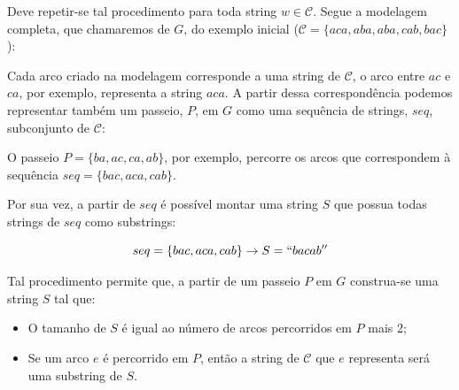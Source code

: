 \documentclass[12pt, a4paper]{article}
\begin{document}
        \sloppy Deve repetir-se tal procedimento para toda string $w \in \mathcal{C}$. Segue a modelagem completa, que chamaremos de $G$, do exemplo inicial ($\mathcal{C} = \{aca, aba, aba, cab, bac\}$):
       

        \begin{figure}[H]
            \centering
        \end{figure}


        Cada arco criado na modelagem corresponde a uma string de $\mathcal{C}$, o arco entre $ac$ e $ca$, por exemplo, representa a string $aca$.
        A partir dessa correspondência podemos representar também um passeio, $P$, em $G$ como uma sequência de strings, $seq$, subconjunto de $\mathcal{C}$:

        O passeio $P = \{ba, ac, ca, ab\}$, por exemplo, percorre os arcos que correspondem à sequência $seq = \{bac, aca, cab\}$.

        Por sua vez, a partir de $seq$ é possível montar uma string $S$ que possua todas strings de $seq$ como substrings:

        \[seq = \{bac, aca, cab\} \rightarrow S = ``bacab'' \]

        Tal procedimento permite que, a partir de um passeio $P$ em $G$ construa-se uma string $S$ tal que:
        
        \begin{itemize}
            \item O tamanho de $S$ é igual ao número de arcos percorridos em $P$ mais 2;
            \item Se um arco $e$ é percorrido em $P$, então a string de $\mathcal{C}$ que $e$ representa será uma substring de $S$.
        \end{itemize}
\end{document}

